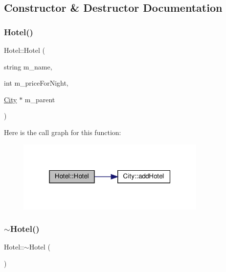 \subsection{Constructor \& Destructor Documentation}
\mbox{\label{class_hotel_aa74ecd8c4a1b959628d28779efb00c46}} 
\subsubsection{\texorpdfstring{Hotel()}{Hotel()}}
{\footnotesize\ttfamily Hotel\+::\+Hotel (\begin{DoxyParamCaption}\item[{string}]{m\+\_\+name,  }\item[{int}]{m\+\_\+price\+For\+Night,  }\item[{\hyperlink{class_city}{City} $\ast$}]{m\+\_\+parent }\end{DoxyParamCaption})}

Here is the call graph for this function\+:\nopagebreak
\begin{figure}[H]
\begin{center}
\leavevmode
\includegraphics[width=265pt]{class_hotel_aa74ecd8c4a1b959628d28779efb00c46_cgraph}
\end{center}
\end{figure}
\mbox{\label{class_hotel_ae4c9782535c021bc10c028339dc29310}} 
\subsubsection{\texorpdfstring{$\sim$\+Hotel()}{~Hotel()}}
{\footnotesize\ttfamily Hotel\+::$\sim$\+Hotel (\begin{DoxyParamCaption}{ }\end{DoxyParamCaption})\hspace{0.3cm}{\ttfamily [inline]}}



